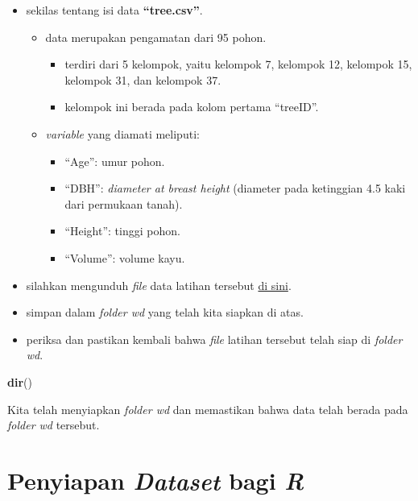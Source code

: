 \documentclass[
  12pt,
  a4paper,
]{scrbook}
\newenvironment{Shaded}{\begin{snugshade}}{\end{snugshade}}
\newcommand{\KeywordTok}[1]{\textcolor[rgb]{0.13,0.29,0.53}{\textbf{#1}}}
\newcommand{\NormalTok}[1]{#1}
\providecommand{\tightlist}{%
  \setlength{\itemsep}{0pt}\setlength{\parskip}{0pt}}
\begin{document}
\begin{itemize}
\tightlist
\item
  sekilas tentang isi data \textbf{``tree.csv''}.

  \begin{itemize}
  \tightlist
  \item
    data merupakan pengamatan dari 95 pohon.

    \begin{itemize}
    \tightlist
    \item
      terdiri dari 5 kelompok, yaitu kelompok 7, kelompok 12, kelompok
      15, kelompok 31, dan kelompok 37.
    \item
      kelompok ini berada pada kolom pertama ``treeID''.
    \end{itemize}
  \item
    \emph{variable} yang diamati meliputi:

    \begin{itemize}
    \tightlist
    \item
      ``Age'': umur pohon.
    \item
      ``DBH'': \emph{diameter at breast height} (diameter pada
      ketinggian 4.5 kaki dari permukaan tanah).
    \item
      ``Height'': tinggi pohon.
    \item
      ``Volume'': volume kayu.
    \end{itemize}
  \end{itemize}
\item
  silahkan mengunduh \emph{file} data latihan tersebut
  \href{https://indarto.weebly.com/uploads/7/9/1/0/7910347/tree.csv}{di
  sini}.
\item
  simpan dalam \emph{folder wd} yang telah kita siapkan di atas.
\item
  periksa dan pastikan kembali bahwa \emph{file} latihan tersebut telah
  siap di \emph{folder wd}.
\end{itemize}

\begin{Shaded}
\begin{Highlighting}[]
\KeywordTok{dir}\NormalTok{()}
\end{Highlighting}
\end{Shaded}

Kita telah menyiapkan \emph{folder wd} dan memastikan bahwa data telah
berada pada \emph{folder wd} tersebut.

\hypertarget{penyiapan-dataset-bagi-r}{%
\section{\texorpdfstring{Penyiapan \emph{Dataset} bagi
\emph{R}}{Penyiapan Dataset bagi R}}\label{penyiapan-dataset-bagi-r}}
\end{document}
